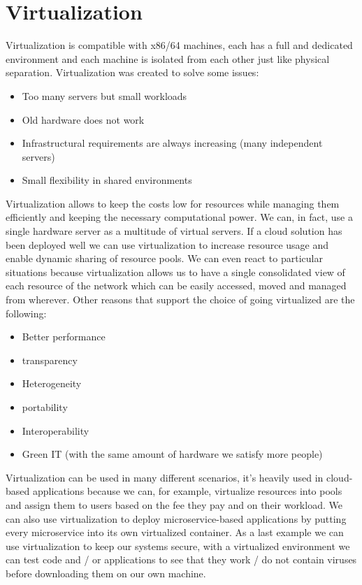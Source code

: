 \section{Virtualization}
Virtualization is compatible with x86/64 machines, each has a full and dedicated environment and each machine is isolated from each other just like physical separation. \n
Virtualization was created to solve some issues:
\begin{itemize}
    \item Too many servers but small workloads
    \item Old hardware does not work
    \item Infrastructural requirements are always increasing (many independent servers)
    \item Small flexibility in shared environments
\end{itemize}
Virtualization allows to keep the costs low for resources while managing them efficiently and keeping the necessary computational power. We can, in fact, use a single hardware server as a multitude of virtual servers. \n
If a cloud solution has been deployed well we can use virtualization to increase resource usage and enable dynamic sharing of resource pools. We can even react to particular situations because virtualization allows us to have a single consolidated view of each resource of the network which can be easily accessed, moved and managed from wherever. \n
Other reasons that support the choice of going virtualized are the following:
\begin{itemize}
    \item Better performance
    \item transparency
    \item Heterogeneity
    \item portability
    \item Interoperability
    \item Green IT (with the same amount of hardware we satisfy more people)
\end{itemize}
Virtualization can be used in many different scenarios, it's heavily used in cloud-based applications because we can, for example, virtualize resources into pools and assign them to users based on the fee they pay and on their workload. \n
We can also use virtualization to deploy microservice-based applications by putting every microservice into its own virtualized container. \n
As a last example we can use virtualization to keep our systems secure, with a virtualized environment we can test code and / or applications to see that they work / do not contain viruses before downloading them on our own machine. \n

